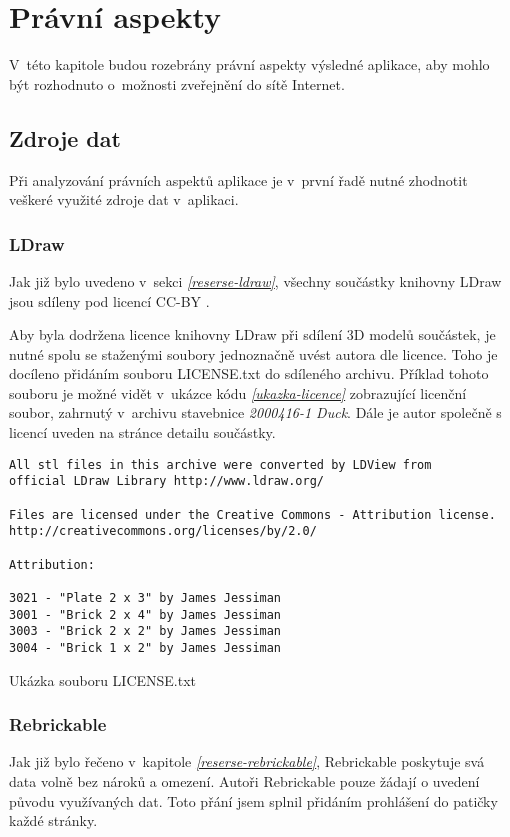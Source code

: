 \chapter{Právní aspekty} 
V~této kapitole budou rozebrány právní aspekty výsledné aplikace, aby mohlo být rozhodnuto o~možnosti zveřejnění do sítě Internet. 

\section{Zdroje dat}
Při analyzování právních aspektů aplikace je v~první řadě nutné zhodnotit veškeré využité zdroje dat v~aplikaci. 

\subsection{LDraw}
Jak již bylo uvedeno v~sekci \emph{\ref{reserse-ldraw}}, všechny součástky knihovny LDraw jsou sdíleny pod licencí \gls{CC-BY} \autocite{CC-BY}.

Aby byla dodržena licence knihovny LDraw při sdílení 3D modelů součástek, je nutné spolu se staženými soubory jednoznačně uvést autora dle licence. Toho je docíleno přidáním souboru LICENSE.txt do sdíleného archivu. Příklad tohoto souboru je možné vidět v~ukázce kódu \emph{\ref{ukazka-licence}} zobrazující licenční soubor, zahrnutý v~archivu stavebnice \textit{2000416-1 Duck}. Dále je autor společně s licencí uveden na stránce detailu součástky.

\begin{listing}[htbp]
        \begin{verbatim}
All stl files in this archive were converted by LDView from 
official LDraw Library http://www.ldraw.org/

Files are licensed under the Creative Commons - Attribution license.
http://creativecommons.org/licenses/by/2.0/

Attribution:

3021 - "Plate 2 x 3" by James Jessiman
3001 - "Brick 2 x 4" by James Jessiman
3003 - "Brick 2 x 2" by James Jessiman
3004 - "Brick 1 x 2" by James Jessiman
        \end{verbatim}
    \caption{Ukázka souboru LICENSE.txt\label{ukazka-licence}}
\end{listing}

\subsection{Rebrickable}
Jak již bylo řečeno v~kapitole \emph{\ref{reserse-rebrickable}}, Rebrickable poskytuje svá data volně bez nároků a omezení. Autoři Rebrickable pouze žádají o uvedení původu využívaných dat. Toto přání jsem splnil přidáním prohlášení do patičky každé stránky.


